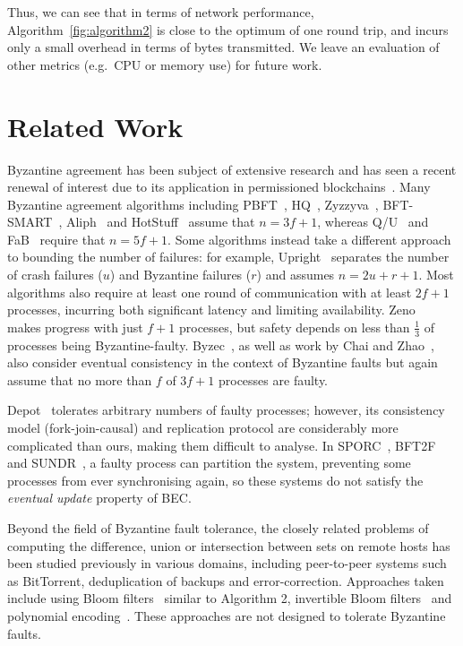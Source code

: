 \documentclass[a4paper,anonymous,USenglish]{lipics-v2019}
\begin{document}
Thus, we can see that in terms of network performance, Algorithm~\ref{fig:algorithm2} is close to the optimum of one round trip, and incurs only a small overhead in terms of bytes transmitted.
We leave an evaluation of other metrics (e.g.\ CPU or memory use) for future work.

\section{Related Work}\label{sec:relwork}

Byzantine agreement has been subject of extensive research and has seen a recent renewal of interest due to its application in permissioned blockchains~\cite{Bano:2019}.
Many Byzantine agreement algorithms including PBFT~\cite{Castro:1999}, HQ~\cite{Cowling:2006}, Zyzzyva~\cite{Kotla:2007}, BFT-SMART~\cite{Bessani:2014}, Aliph~\cite{Aublin:2015} and HotStuff~\cite{Yin:2019} assume that $n=3f+1$, whereas Q/U~\cite{Abd:2005} and FaB~\cite{Martin:2006} require that $n=5f+1$.
Some algorithms instead take a different approach to bounding the number of failures: for example, Upright~\cite{Clement:2009} separates the number of crash failures ($u$) and Byzantine failures ($r$) and assumes $n=2u+r+1$.
Most algorithms also require at least one round of communication with at least $2f+1$ processes, incurring both significant latency and limiting availability.
Zeno~\cite{Singh:2009} makes progress with just $f+1$ processes, but safety depends on less than $\frac{1}{3}$ of processes being Byzantine-faulty.
Byzec~\cite{Shoker:2017}, as well as work by Chai and Zhao~\cite{Chai:2014}, also consider eventual consistency in the context of Byzantine faults but again assume that no more than $f$ of $3f+1$ processes are faulty.

Depot~\cite{Mahajan:2011} tolerates arbitrary numbers of faulty processes; however, its consistency model (fork-join-causal) and replication protocol are considerably more complicated than ours, making them difficult to analyse.
In SPORC~\cite{Feldman:2010wl}, BFT2F~\cite{Li:2007} and SUNDR~\cite{Mazieres:2002}, a faulty process can partition the system, preventing some processes from ever synchronising again, so these systems do not satisfy the \emph{eventual update} property of BEC.

Beyond the field of Byzantine fault tolerance, the closely related problems of computing the difference, union or intersection between sets on remote hosts has been studied previously in various domains, including peer-to-peer systems such as BitTorrent, deduplication of backups and error-correction.
Approaches taken include using Bloom filters~\cite{Skjegstad:2011} similar to Algorithm 2, invertible Bloom filters~\cite{Goodrich:2011,Eppstein:2011} and polynomial encoding~\cite{Minsky:2006}.
These approaches are not designed to tolerate Byzantine faults.
\end{document}
